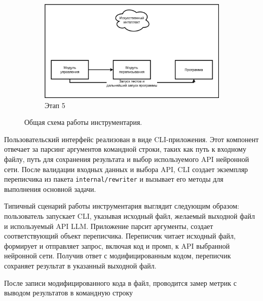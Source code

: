 \begin{figure}[h!]
    \begin{subfigure}[b]{0.5\textwidth} %
        \centering
        \includegraphics[width=\textwidth]{images/METAMORPHLLM5.png} %
        \caption{Этап 5}
        \label{fig:photo_221_5}
    \end{subfigure}

    \caption{Общая схема работы инструментария.}
    \label{fig:my_five_photos_221} %

\end{figure} %

Пользовательский интерфейс реализован в виде CLI-приложения. Этот компонент отвечает за парсинг аргументов командной строки, таких как путь к входному файлу, путь для сохранения результата и выбор используемого API нейронной сети. После валидации входных данных и выбора API, CLI создает экземпляр переписчика из пакета \texttt{internal/rewriter} и вызывает его методы для выполнения основной задачи.

Типичный сценарий работы инструментария выглядит следующим образом: пользователь запускает CLI, указывая исходный файл, желаемый выходной файл и используемый API LLM. Приложение парсит аргументы, создает соответствующий объект переписчика. Переписчик читает исходный файл, формирует и отправляет запрос, включая код и промп, к API выбранной нейронной сети. Получив ответ с модифицированным кодом, переписчик сохраняет результат в указанный выходной файл.

После записи модифицированного кода в файл, проводится замер метрик с выводом результатов в командную строку

